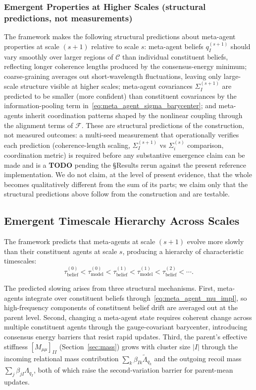 \documentclass[11pt]{article}
\begin{document}
\subsubsection{Emergent Properties at Higher Scales (structural predictions, not measurements)}

The framework makes the following structural predictions about meta-agent properties at scale $(s{+}1)$ relative to scale $s$: meta-agent beliefs $q_I^{(s+1)}$ should vary smoothly over larger regions of $\mathcal{C}$ than individual constituent beliefs, reflecting longer coherence lengths produced by the consensus-energy minimum; coarse-graining averages out short-wavelength fluctuations, leaving only large-scale structure visible at higher scales; meta-agent covariances $\Sigma_I^{(s+1)}$ are predicted to be smaller (more confident) than constituent covariances by the information-pooling term in~\eqref{eq:meta_agent_sigma_barycenter}; and meta-agents inherit coordination patterns shaped by the nonlinear coupling through the alignment terms of $\mathcal{F}$. These are structural predictions of the construction, not measured outcomes: a multi-seed measurement that operationally verifies each prediction (coherence-length scaling, $\Sigma_I^{(s+1)}$ vs $\Sigma_i^{(s)}$ comparison, coordination metric) is required before any substantive emergence claim can be made and is a \textbf{TODO} pending the §Results rerun against the present reference implementation. We do not claim, at the level of present evidence, that the whole becomes qualitatively different from the sum of its parts; we claim only that the structural predictions above follow from the construction and are testable.

\subsection{Emergent Timescale Hierarchy Across Scales}
\label{sec:emergent_timescale}

The framework predicts that meta-agents at scale $(s+1)$ evolve more slowly than their constituent agents at scale $s$, producing a hierarchy of characteristic timescales:
\begin{equation}
\tau_{\text{belief}}^{(0)} < \tau_{\text{model}}^{(0)} < \tau_{\text{belief}}^{(1)} < \tau_{\text{model}}^{(1)} < \tau_{\text{belief}}^{(2)} < \cdots.
\end{equation}

The predicted slowing arises from three structural mechanisms. First, meta-agents integrate over constituent beliefs through~\eqref{eq:meta_agent_mu_impl}, so high-frequency components of constituent belief drift are averaged out at the parent level. Second, changing a meta-agent state requires coherent change across multiple constituent agents through the gauge-covariant barycenter, introducing consensus energy barriers that resist rapid updates. Third, the parent's effective stiffness $[M_{\mu\mu}]_{II}$ (Section~\ref{sec:mass}) grows with cluster size $|I|$ through the incoming relational mass contribution $\sum_k \beta_{Ik}\tilde\Lambda_{q_k}$ and the outgoing recoil mass $\sum_j \beta_{jI}\Lambda_{q_I}$, both of which raise the second-variation barrier for parent-mean updates.
\end{document}

